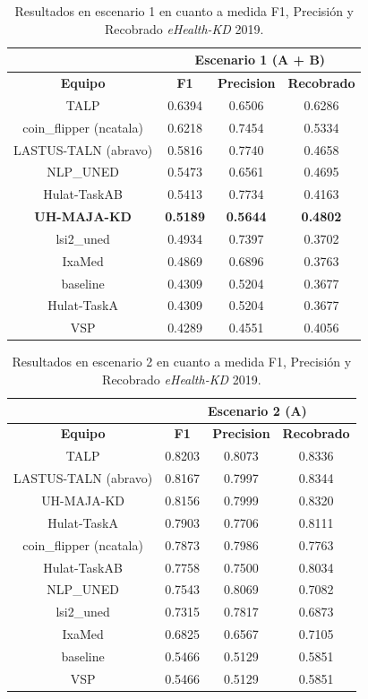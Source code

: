 \begin{table}[tb!]\centering
	\caption{Resultados en escenario 1 en cuanto a medida F1, Precisi\'on y Recobrado \textit{eHealth-KD} 2019. \label{table:results_19_escenario1}}
	\begin{tabular}{|c|c|c|c|}
		\hline
		&  \multicolumn{3}{c|}{\textbf{Escenario 1 (A + B)}} \\
		\hline
		\textbf{Equipo} & \textbf{F1} & \textbf{Precision} & \textbf{Recobrado} \\
		\hline
		TALP	          	   &  0.6394 &  0.6506 &  0.6286 \\
		coin\_flipper (ncatala) & 0.6218 &  0.7454 &  0.5334 \\	
		LASTUS-TALN (abravo)   & 0.5816 &  0.7740 &  0.4658	\\
		NLP\_UNED               & 0.5473 & 0.6561 &  0.4695 \\
		Hulat-TaskAB           & 0.5413 &  0.7734 &  0.4163 \\	
		\textbf{UH-MAJA-KD}    & \textbf{0.5189} &  \textbf{0.5644} &  \textbf{0.4802} \\	
		lsi2\_uned              & 0.4934 &  0.7397 & 0.3702	\\
		IxaMed                 & 0.4869 &  0.6896 &  0.3763 \\
		baseline               & 0.4309 &  0.5204 &  0.3677 \\
		Hulat-TaskA            & 0.4309 &  0.5204 &  0.3677 \\	
		VSP             	   & 0.4289 &  0.4551 &  0.4056 \\	
		\hline
	\end{tabular}
\end{table}

\begin{table}[tb!]\centering
	\caption{Resultados en escenario 2 en cuanto a medida F1, Precisi\'on y Recobrado \textit{eHealth-KD} 2019. \label{table:results_19_escenario2}}
	\begin{tabular}{|c|c|c|c|}
		\hline
		&  \multicolumn{3}{c|}{\textbf{Escenario 2 (A) }} \\
		\hline
		\textbf{Equipo} & \textbf{F1} & \textbf{Precision} & \textbf{Recobrado} \\
		\hline
		TALP	& 0.8203 & 0.8073 & 0.8336	\\
		LASTUS-TALN (abravo) & 0.8167 & 0.7997 & 0.8344	 \\
		UH-MAJA-KD & 0.8156 & 0.7999 & 0.8320	\\
		Hulat-TaskA & 0.7903 & 0.7706 & 0.8111	\\
		coin\_flipper (ncatala) & 0.7873 & 0.7986 & 0.7763	\\
		Hulat-TaskAB & 0.7758 & 0.7500 & 0.8034	 \\
		NLP\_UNED & 0.7543 & 0.8069 & 0.7082	\\
		lsi2\_uned & 0.7315 & 0.7817 & 0.6873 \\	 
		IxaMed & 0.6825 & 0.6567 & 0.7105	 \\
		baseline & 0.5466 & 0.5129 & 0.5851	\\
		VSP & 0.5466 & 0.5129 & 0.5851	\\
		\hline
	\end{tabular}
\end{table}

